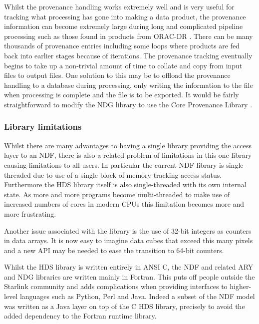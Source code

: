 \documentclass[final,authoryear,5p,times,twocolumn]{elsarticle}
\begin{document}
Whilst the provenance handling works extremely well and is very useful
for tracking what processing has gone into making a data product, the
provenance information can become extremely large during long and
complicated pipeline processing such as those found in products from
ORAC-DR \citep{2008AN....329..295C}.  There can be many thousands of
provenance entries including some loops where products are fed back
into earlier stages because of iterations.  The provenance tracking
eventually begins to take up a non-trivial amount of time to collate
and copy from input files to output files. One solution to this may be
to offload the provenance handling to a database during processing,
only writing the information to the file when processing is complete
and the file is to be exported. It would be fairly straightforward to
modify the NDG library to use the Core Provenance Library
\citep{Macko:2012:GPL:2342875.2342881}.

\subsubsection{Library limitations}

Whilst there are many advantages to having a single library
providing the access layer to an NDF, there is also a related problem
of limitations in this one library causing limitations to all
users. In particular the current NDF library is single-threaded due to
use of a single block of memory tracking access status. Furthermore
the HDS library itself is also single-threaded with its own internal
state. As more and more programs become multi-threaded to make use of
increased numbers of cores in modern CPUs this limitation becomes more
and more frustrating.

Another issue associated with the library is the use of 32-bit
integers as counters in data arrays. It is now easy to imagine data
cubes that exceed this many pixels and a new API may be needed to ease
the transition to 64-bit counters.

Whilst the HDS library is written entirely in ANSI C, the NDF and
related ARY \citep{SUN11} and NDG \citep{SUN2} libraries are written
mainly in Fortran.
This puts off people outside the Starlink community and
adds complications when providing interfaces to higher-level languages
such as Python, Perl and Java. Indeed a subset of the NDF model  was
written as a Java layer on top of the C HDS library, precisely to
avoid the added dependency to the Fortran runtime library.
\end{document}
